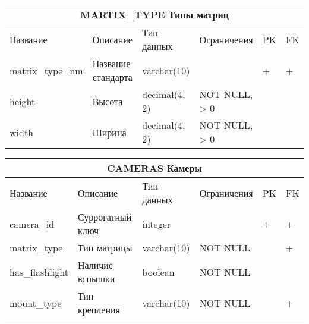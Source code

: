 \documentclass{article}
\begin{document}
\begin{tabular}{ |p{4cm}|p{4cm}|p{2.5cm}|p{3.5cm}|p{2cm}|p{1cm}| }
\hline
\multicolumn{6}{|c|}{MARTIX\_TYPE Типы матриц} \\
\hline
Название & Описание & Тип данных & Ограничения & PK & FK\\
\hline
matrix\_type\_nm                    &   %
Название стандарта                  &   %
varchar(10)                         &   %
                                    &   %
 +                                  &   %
 +                                  \\  %
\hline
height                              &   %
Высота                              &   %
decimal(4, 2)                       &   %
NOT NULL, \linebreak
> 0                                 &   %
                                    &   %
                                    \\  %
\hline
width                               &   %
Ширина                              &   %
decimal(4, 2)                       &   %
NOT NULL, \linebreak
> 0                                 &   %
                                    &   %
                                    \\  %
\hline
\end{tabular}

\begin{tabular}{ |p{4cm}|p{4cm}|p{2.5cm}|p{3.5cm}|p{2cm}|p{1cm}| }
\hline
\multicolumn{6}{|c|}{CAMERAS Камеры} \\
\hline
Название & Описание & Тип данных & Ограничения & PK & FK\\
\hline
camera\_id                          &   %
Суррогатный ключ                    &   %
integer                             &   %
                                    &   %
 +                                  &   %
 +                                  \\  %
\hline
matrix\_type                        &   %
Тип матрицы                         &   %
varchar(10)                         &   %
NOT NULL                            &   %
                                    &   %
 +                                  \\  %
\hline
has\_flashlight                     &   %
Наличие вспышки                     &   %
boolean                             &   %
NOT NULL                            &   %
                                    &   %
                                    \\  %
\hline
mount\_type                         &   %
Тип крепления                       &   %
varchar(10)                         &   %
NOT NULL                            &   %
                                    &   %
 +                                  \\  %
\hline
\end{tabular}
\end{document}
